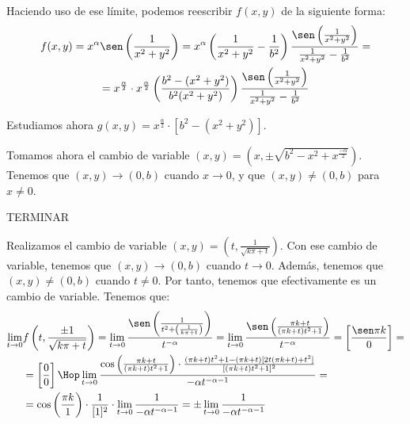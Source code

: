 \begin{ejercicio}
\begin{enumerate}
\begin{enumerate}
            Haciendo uso de ese límite, podemos reescribir $f(x,y)$ de la siguiente forma:
            \begin{multline*}
                f(x,y)=x^\alpha \sen\left(\frac{1}{x^2+y^2}\right)
                = x^\alpha \left(\frac{1}{x^2+y^2} - \frac{1}{b^2}\right) \frac{\sen\left(\frac{1}{x^2+y^2}\right)}{\frac{1}{x^2+y^2} - \frac{1}{b^2}}
                =\\= x^{\frac{\alpha}{2}}\cdot x^{\frac{\alpha}{2}} \left(\frac{b^2-(x^2+y^2)}{b^2(x^2+y^2)}\right) \frac{\sen\left(\frac{1}{x^2+y^2}\right)}{\frac{1}{x^2+y^2} - \frac{1}{b^2}}
            \end{multline*}

            Estudiamos ahora $g(x,y)=x^{\frac{\alpha}{2}}\cdot [b^2-(x^2+y^2)]$.

            Tomamos ahora el cambio de variable $(x,y)=\left(x,\pm \sqrt{b^2-x^2+x^{\frac{-\alpha}{2}}}\right)$. Tenemos que $(x,y)\to (0,b)$ cuando $x\to 0$, y que $(x,y)\neq (0,b)$ para $x\neq 0$.

            TERMINAR




            

            
            Realizamos el cambio de variable $(x,y)=\left(t,\frac{1}{\sqrt{k\pi + t}}\right)$. Con ese cambio de variable, tenemos que $(x,y)\to (0,b)$ cuando $t\to 0$. Además, tenemos que $(x,y)\neq (0,b)$ cuando $t\neq 0$. Por tanto, tenemos que efectivamente es un cambio de variable. Tenemos que:
            \begin{equation*}\begin{split}
                \lim_{t\to 0}& f\left(t,\frac{\pm 1}{\sqrt{k\pi + t}}\right)
                = \lim_{t\to 0}\frac{\sen \left(\frac{1}{t^2 + \left(\frac{1}{k\pi + t}\right)}\right) }{t^{-\alpha}}
                = \lim_{t\to 0}\frac{\sen \left(\frac{\pi k + t}{(\pi k +t)t^2 + 1}\right) }{t^{-\alpha}}
                = \left[\frac{\sen \pi k}{0}\right] =
                \\&=\left[\frac{0}{0}\right]\Hop
                \lim_{t\to 0}\frac{\cos\left(\frac{\pi k + t}{(\pi k +t)t^2 + 1}\right) \cdot \frac{(\pi k +t)t^2 + 1 -(\pi k + t)[2t(\pi k + t) + t^2]}{[(\pi k +t)t^2 + 1]^2}}{-\alpha t^{-\alpha -1}}
                =\\&= 
                \cos\left(\frac{\pi k}{1}\right) \cdot \frac{1}{[1]^2} \cdot \lim_{t\to 0}
                \frac{1}{-\alpha t^{-\alpha -1}}
                = 
                \pm \lim_{t\to 0}
                \frac{1}{-\alpha t^{-\alpha -1}}
            \end{split}\end{equation*}


\end{enumerate}
\end{enumerate}
\end{ejercicio}
